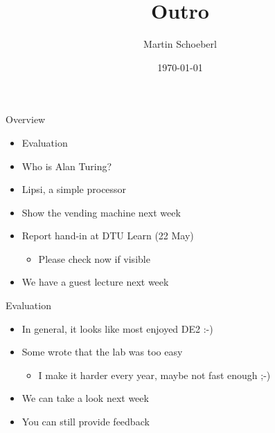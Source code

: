 

\newif\ifbook


\title{Outro}
\author{Martin Schoeberl}
\date{\today}



\begin{frame}
\titlepage
\end{frame}

\begin{frame}[fragile]{Overview}
\begin{itemize}
\item Evaluation
\item Who is Alan Turing?
\item Lipsi, a simple processor
\item Show the vending machine next week
\item Report hand-in at DTU Learn (22 May)
\begin{itemize}
\item Please check now if visible
\end{itemize}
\item We have a guest lecture next week
\end{itemize}
\end{frame}




\begin{frame}[fragile]{Evaluation}
\begin{itemize}
\item In general, it looks like most enjoyed DE2 :-)
\item Some wrote that the lab was too easy
\begin{itemize}
\item I make it harder every year, maybe not fast enough ;-)
\end{itemize}
\item We can take a look next week
\item You can still provide feedback
\end{itemize}
\end{frame}

